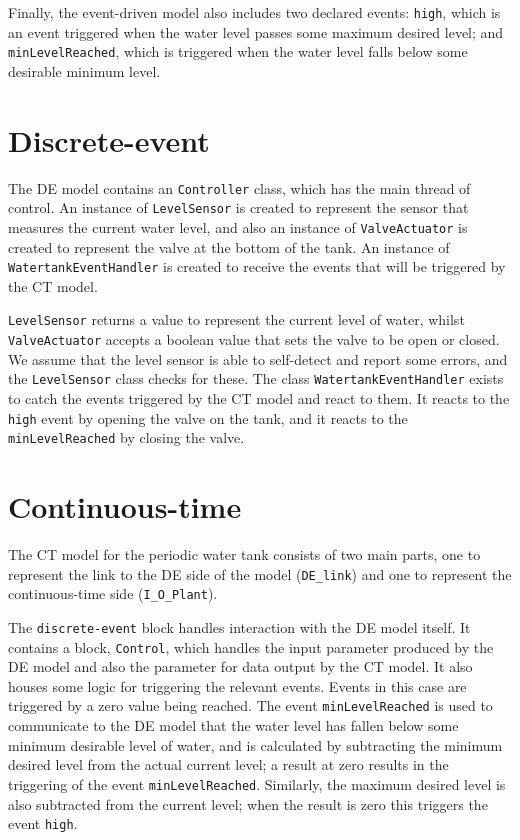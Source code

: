 Finally, the event-driven model also includes two declared events:
\texttt{high}, which is an event triggered when the water level passes
some maximum desired level; and \texttt{minLevelReached}, which is
triggered when the water level falls below some desirable minimum
level.

\section{Discrete-event} The DE model contains an
\texttt{Controller} class, which has the main thread of control.  An
instance of \texttt{LevelSensor} is created to represent the sensor
that measures the current water level, and also an instance of
\texttt{ValveActuator} is created to represent the valve at the bottom
of the tank.  An instance of \texttt{WatertankEventHandler} is created
to receive the events that will be triggered by the CT model.

\texttt{LevelSensor} returns a value to represent the current level of
water, whilst \texttt{ValveActuator} accepts a boolean value that sets
the valve to be open or closed.  We assume that the level sensor is
able to self-detect and report some errors, and the
\texttt{LevelSensor} class checks for these. The class
\texttt{WatertankEventHandler} exists to catch the events triggered by
the CT model and react to them.  It reacts to the \texttt{high} event
by opening the valve on the tank, and it reacts to the
\texttt{minLevelReached} by closing the valve.

\section{Continuous-time}
The CT model for the periodic water tank consists of two main parts,
one to represent the link to the DE side of the model (\texttt{DE\_link})
and one to represent the continuous-time side
(\texttt{I\_O\_Plant}).

The \texttt{discrete-event} block handles interaction with the DE
model itself.  It contains a block, \texttt{Control}, which handles
the input parameter produced by the DE model and also the parameter
for data output by the CT model.  It also houses some logic for
triggering the relevant events.  Events in this case are triggered by
a zero value being reached.  The event \texttt{minLevelReached} is
used to communicate to the DE model that the water level has fallen
below some minimum desirable level of water, and is calculated by
subtracting the minimum desired level from the actual current level; a
result at zero results in the triggering of the event
\texttt{minLevelReached}.  Similarly, the maximum desired level is
also subtracted from the current level; when the result is zero this
triggers the event \texttt{high}.


